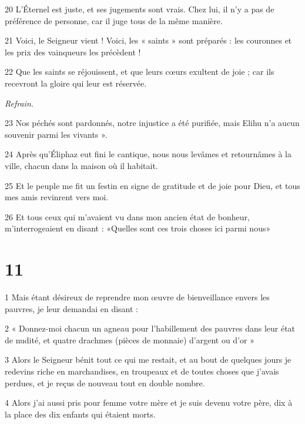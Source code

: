 \par 20 L'Éternel est juste, et ses jugements sont vrais. Chez lui, il n'y a pas de préférence de personne, car il juge tous de la même manière.

\par 21 Voici, le Seigneur vient ! Voici, les « saints » sont préparés : les couronnes et les prix des vainqueurs les précèdent !

\par 22 Que les saints se réjouissent, et que leurs cœurs exultent de joie ; car ils recevront la gloire qui leur est réservée.

\par \textit{Refrain.}

\par 23 Nos péchés sont pardonnés, notre injustice a été purifiée, mais Elihu n'a aucun souvenir parmi les vivants ».

\par 24 Après qu'Éliphaz eut fini le cantique, nous nous levâmes et retournâmes à la ville, chacun dans la maison où il habitait.

\par 25 Et le peuple me fit un festin en signe de gratitude et de joie pour Dieu, et tous mes amis revinrent vers moi.

\par 26 Et tous ceux qui m'avaient vu dans mon ancien état de bonheur, m'interrogeaient en disant : «Quelles sont ces trois choses ici parmi nous»

\chapter{11}

\par 1 Mais étant désireux de reprendre mon œuvre de bienveillance envers les pauvres, je leur demandai en disant :

\par 2 « Donnez-moi chacun un agneau pour l'habillement des pauvres dans leur état de nudité, et quatre drachmes (pièces de monnaie) d'argent ou d'or »

\par 3 Alors le Seigneur bénit tout ce qui me restait, et au bout de quelques jours je redevins riche en marchandises, en troupeaux et de toutes choses que j'avais perdues, et je reçus de nouveau tout en double nombre.

\par 4 Alors j'ai aussi pris pour femme votre mère et je suis devenu votre père, dix à la place des dix enfants qui étaient morts.

